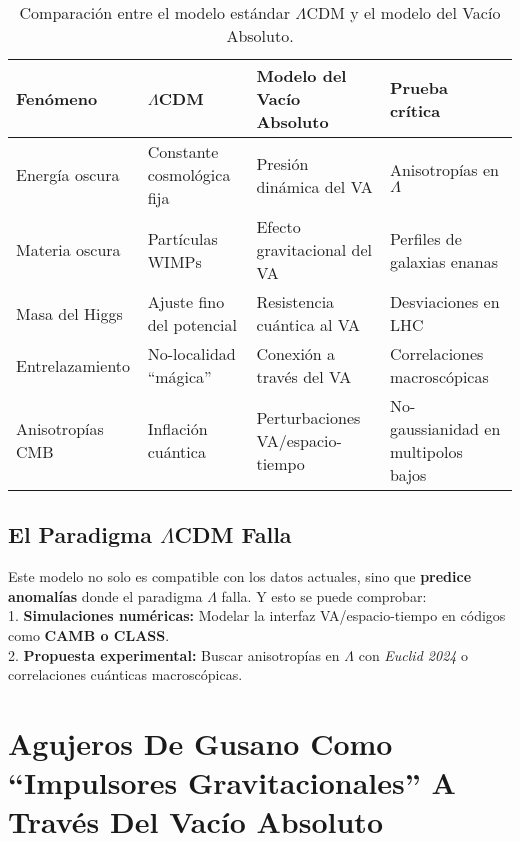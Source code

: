 \documentclass[a4paper]{article}
\theoremstyle{definition}
\theoremstyle{remark}
\numberwithin{equation}{section}
\begin{document}
	\begin{table}[H] %
		\centering
		\renewcommand{\arraystretch}{1.3}
		\begin{tabularx}{\textwidth}{|X|X|X|X|}
			\hline
			\textbf{Fenómeno} & \textbf{\(\Lambda\)CDM} & \textbf{Modelo del Vacío Absoluto} & \textbf{Prueba crítica} \\
			\hline
			Energía oscura & Constante cosmológica fija & Presión dinámica del VA & Anisotropías en \( \Lambda \) \\
			\hline
			Materia oscura & Partículas WIMPs & Efecto gravitacional del VA & Perfiles de galaxias enanas \\
			\hline
			Masa del Higgs & Ajuste fino del potencial & Resistencia cuántica al VA & Desviaciones en LHC \\
			\hline
			Entrelazamiento & No-localidad ``mágica'' & Conexión a través del VA & Correlaciones macroscópicas \\
			\hline
			Anisotropías CMB & Inflación cuántica \cite{Bezrukov} & Perturbaciones VA/espacio-tiempo & No-gaussianidad en multipolos bajos \\
			\hline
		\end{tabularx}
		\caption{Comparación entre el modelo estándar \(\Lambda\)CDM y el modelo del Vacío Absoluto.}
	\end{table}
	
	
	
	\subsection{El Paradigma \(\Lambda\)CDM Falla}
	
	Este modelo no solo es compatible con los datos actuales, sino que \textbf{predice anomalías} donde el paradigma \(\Lambda\) falla. Y esto se puede comprobar:\\
	
	1. \textbf{Simulaciones numéricas:} Modelar la interfaz VA/espacio-tiempo en códigos como \textbf{CAMB o CLASS}.\\
	
	2. \textbf{Propuesta experimental:} Buscar anisotropías en \(\Lambda\) con \textit{Euclid 2024} o correlaciones cuánticas macroscópicas.
	
	
	
	\section{Agujeros De Gusano Como ``Impulsores Gravitacionales'' A Través Del Vacío Absoluto}
	
\end{document}
